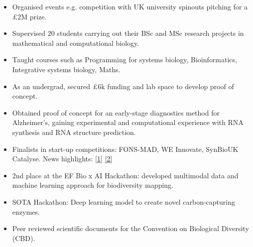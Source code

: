 \documentclass[10pt,a4paper,ragged2e,withhyper]{altacv}
\begin{document}
\begin{paracol}{2}

\begin{itemize}
\item Organised events e.g. competition with UK university spinouts pitching for a £2M prize.
\end{itemize}
\vspace{-1.5\baselineskip} %
\divider

\begin{itemize}
\item Supervised 20 students carrying out their BSc and MSc research projects in mathematical and computational biology.
\item Taught courses such as Programming for systems biology, Bioinformatics, Integrative systems biology, Maths.
\end{itemize}
\vspace{-0.5\baselineskip} %

\divider

\begin{itemize}
\item As an undergrad, secured £6k funding and lab space to develop proof of concept.
    \item Obtained proof of concept for an early-stage diagnostics method
for Alzheimer’s, gaining experimental and computational experience with RNA synthesis and RNA structure prediction. 
\item Finalists in start-up competitions: FONS-MAD, WE Innovate, SynBioUK Catalyse. News highlights: \faLink \href{https://www.imperial.ac.uk/news/187629/four-student-ideas-that-could-change/}{[1]} \href{https://www.imperial.ac.uk/news/190372/five-women-led-startups-building-better-future/}{[2]}
\end{itemize}

\medskip
{}
\begin{itemize}
    \item 2nd place at the EF Bio x AI Hackathon: developed multimodal data and machine learning approach for biodiversity mapping.
    
    \item SOTA Hackathon: Deep learning model to create novel carbon-capturing enzymes.
    \item Peer reviewed scientific documents for the Convention on Biological Diversity (CBD).
\end{itemize}
 \medskip


\end{paracol}
\end{document}
